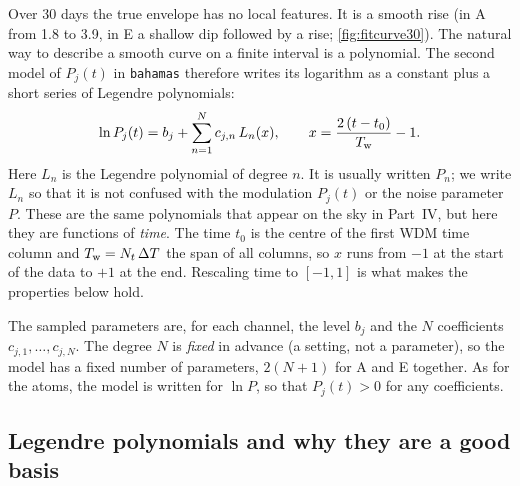 \documentclass[11pt,a4paper]{article}
\begin{document}
Over 30 days the true envelope has no local features. It is a smooth rise (in A from
1.8 to 3.9, in E a shallow dip followed by a rise; \cref{fig:fitcurve30}). The
natural way to describe a smooth curve on a finite interval is a polynomial. The
second model of $P_j(t)$ in \texttt{bahamas} therefore writes its logarithm as a
constant plus a short series of Legendre polynomials:
\begin{equation}
  \ln P_j(t) = b_j + \sum_{n=1}^{N} c_{j,n}\,L_n(x),
  \qquad
  x = \frac{2\,(t-t_0)}{T_{\rm w}} - 1 .
  \label{eq:legendre}
\end{equation}
Here $L_n$ is the Legendre polynomial of degree $n$. It is usually written $P_n$; we
write $L_n$ so that it is not confused with the modulation $P_j(t)$ or the noise
parameter $P$. These are the same polynomials that appear on the sky in Part~IV, but
here they are functions of \emph{time}. The time $t_0$ is the centre of the first WDM
time column and $T_{\rm w}=N_t\,\Delta T$ the span of all columns, so $x$ runs from
$-1$ at the start of the data to $+1$ at the end. Rescaling time to $[-1,1]$ is what
makes the properties below hold.

The sampled parameters are, for each channel, the level $b_j$ and the $N$
coefficients $c_{j,1},\dots,c_{j,N}$. The degree $N$ is \emph{fixed} in advance (a
setting, not a parameter), so the model has a fixed number of parameters, $2(N+1)$
for A and E together. As for the atoms, the model is written for $\ln P$, so that
$P_j(t)>0$ for any coefficients.

\subsection{Legendre polynomials and why they are a good basis}
\end{document}
